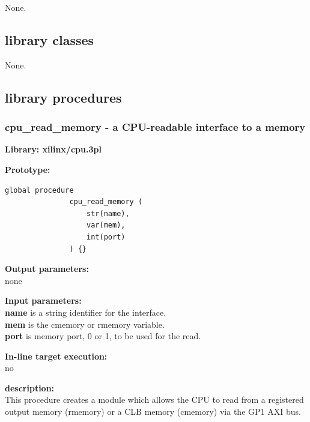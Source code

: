         None.



    \subsection{library classes}
    
        None.


    
    \subsection{library procedures}
            
                


            

        \subsubsection{cpu\_read\_memory - a CPU-readable interface
                                            to a memory}\label{sec:lpcpurdmem}

            {\bf Library: xilinx/cpu.3pl}

            {\bf Prototype:} \\
            \vsp
            \begin{lstlisting}[gobble=12, language=threepl]
               global procedure
               cpu_read_memory (
                   str(name),
                   var(mem),
                   int(port)
               ) {}
            \end{lstlisting}

            {\bf Output parameters:} \\
            none

            {\bf Input parameters:} \\
            {\bf name} is a string identifier for the interface.\\
            {\bf mem} is the cmemory or rmemory variable.\\
            {\bf port} is memory port, 0 or 1, to be used for the read.
        
            {\bf In-line target execution:} \\
            no

            {\bf description:} \\
            This procedure creates a module which allows the CPU to read
            from a registered output memory (rmemory) or a CLB memory (cmemory)
            via the GP1 AXI bus.
            
